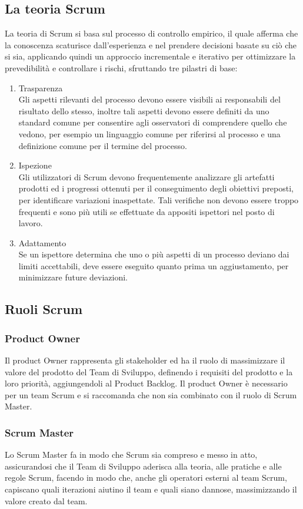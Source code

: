 \subsection{La teoria Scrum}
La teoria di Scrum si basa sul processo di controllo empirico, il quale afferma che la conoscenza scaturisce dall'esperienza e nel prendere decisioni basate su ciò che si sia, applicando quindi un approccio incrementale e iterativo per ottimizzare la prevedibilità e controllare i rischi, sfruttando tre pilastri di base:
\begin{enumerate}
	\item Trasparenza \\ Gli aspetti rilevanti del processo devono essere visibili ai responsabili del risultato dello stesso, inoltre tali aspetti devono essere definiti da uno standard comune per consentire agli osservatori di comprendere quello che vedono, per esempio un linguaggio comune per riferirsi al processo e una definizione comune per il termine del processo.
	\item Ispezione \\ Gli utilizzatori di Scrum devono frequentemente analizzare gli artefatti prodotti ed i progressi ottenuti per il conseguimento degli obiettivi preposti, per identificare variazioni inaspettate. Tali verifiche non devono essere troppo frequenti e sono più utili se effettuate da appositi ispettori nel posto di lavoro.
	\item Adattamento \\ Se un ispettore determina che uno o più aspetti di un processo deviano dai limiti accettabili, deve essere eseguito quanto prima un aggiustamento, per minimizzare future deviazioni.
\end{enumerate}

\subsection{Ruoli Scrum}
\subsubsection{Product Owner}
Il product Owner rappresenta gli stakeholder ed ha il ruolo di massimizzare il valore del prodotto del Team di Sviluppo, definendo i requisiti del prodotto e la loro priorità, aggiungendoli al Product Backlog. Il product Owner è necessario per un team Scrum e si raccomanda che non sia combinato con il ruolo di Scrum Master.
\subsubsection{Scrum Master}
Lo Scrum Master fa in modo che Scrum sia compreso e messo in atto, assicurandosi che il Team di Sviluppo aderisca alla teoria, alle pratiche e alle regole Scrum, facendo in modo che, anche gli operatori esterni al team Scrum, capiscano quali iterazioni aiutino il team e quali siano dannose, massimizzando il valore creato dal team.
